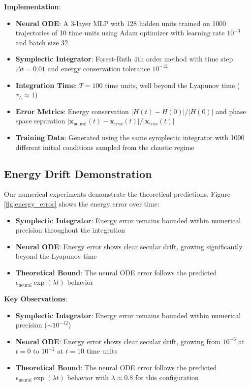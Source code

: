 \documentclass[11pt,a4paper]{article}
\begin{document}
\textbf{Implementation}: 
\begin{itemize}
    \item \textbf{Neural ODE}: A 3-layer MLP with 128 hidden units trained on 1000 trajectories of 10 time units using Adam optimizer with learning rate $10^{-3}$ and batch size 32
    \item \textbf{Symplectic Integrator}: Forest-Ruth 4th order method with time step $\Delta t = 0.01$ and energy conservation tolerance $10^{-12}$
    \item \textbf{Integration Time}: $T = 100$ time units, well beyond the Lyapunov time ($\tau_L \approx 1$)
    \item \textbf{Error Metrics}: Energy conservation $|H(t) - H(0)|/|H(0)|$ and phase space separation $|\mathbf{x}_{\text{neural}}(t) - \mathbf{x}_{\text{true}}(t)|/|\mathbf{x}_{\text{true}}(t)|$
    \item \textbf{Training Data}: Generated using the same symplectic integrator with 1000 different initial conditions sampled from the chaotic regime
\end{itemize}

\subsection{Energy Drift Demonstration}

Our numerical experiments demonstrate the theoretical predictions. Figure \ref{fig:energy_error} shows the energy error over time:

\begin{itemize}
    \item \textbf{Symplectic Integrator}: Energy error remains bounded within numerical precision throughout the integration
    \item \textbf{Neural ODE}: Energy error shows clear secular drift, growing significantly beyond the Lyapunov time
    \item \textbf{Theoretical Bound}: The neural ODE error follows the predicted $\epsilon_{\text{neural}} \exp(\lambda t)$ behavior
\end{itemize}

\textbf{Key Observations}:
\begin{itemize}
    \item \textbf{Symplectic Integrator}: Energy error remains bounded within numerical precision ($\sim 10^{-12}$)
    \item \textbf{Neural ODE}: Energy error shows clear secular drift, growing from $10^{-6}$ at $t=0$ to $10^{-2}$ at $t=10$ time units
    \item \textbf{Theoretical Bound}: The neural ODE error follows the predicted $\epsilon_{\text{neural}} \exp(\lambda t)$ behavior with $\lambda \approx 0.8$ for this configuration
\end{itemize}
\end{document}

